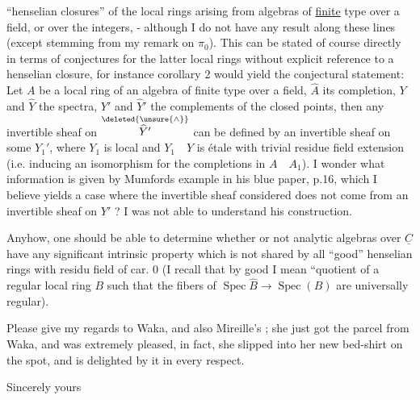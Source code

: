 
``henselian closures'' of the local rings arising from algebras of \uline{finite} type over a field, or over the integers, - although I do not have any result along these lines (except  stemming from my remark on $\pi_0$).  This can be stated of course directly in terms of conjectures for the latter local rings without explicit reference to a henselian closure, for instance corollary 2 would yield the conjectural statement: Let $A$ be a local  ring of an algebra of finite type over a field, $\widehat{A}$ its completion, $Y$ and $\widehat{Y}$ the spectra, $Y'$ and $\widehat{Y}'$ the complements of the closed points,  then any invertible sheaf on $\overset{\deleted{\unsure{\wedge}}}{\widehat{Y}'}$ can be defined by an invertible sheaf on some $Y_1'$, where $Y_1$ is local and $Y_1\quad Y$ is étale with trivial residue field extension (i.e. inducing an isomorphism for the completions in $A\quad A_1$). I wonder what information is given by Mumfords example in his blue paper, p.16, which I believe yields a case where the invertible sheaf considered does not come from an invertible sheaf on $Y'$ ? I  was not able to understand his construction.

Anyhow, one should be able to determine whether or not  analytic algebras over $\underline{C}$ have any significant intrinsic property which is not shared by all ``good'' henselian rings with residu field of car. 0 (I recall that by good I mean ``quotient of a regular local ring $B$ such that the fibers of $\operatorname{Spec}\widehat{B}\rightarrow\operatorname{Spec}(B)$ are universally regular).

Please give my regards to Waka, and also Mireille's ; she just got the parcel from Waka, and was extremely pleased, in fact, she slipped into her new bed-shirt on the spot, and is delighted by it in every respect.

Sincerely yours

